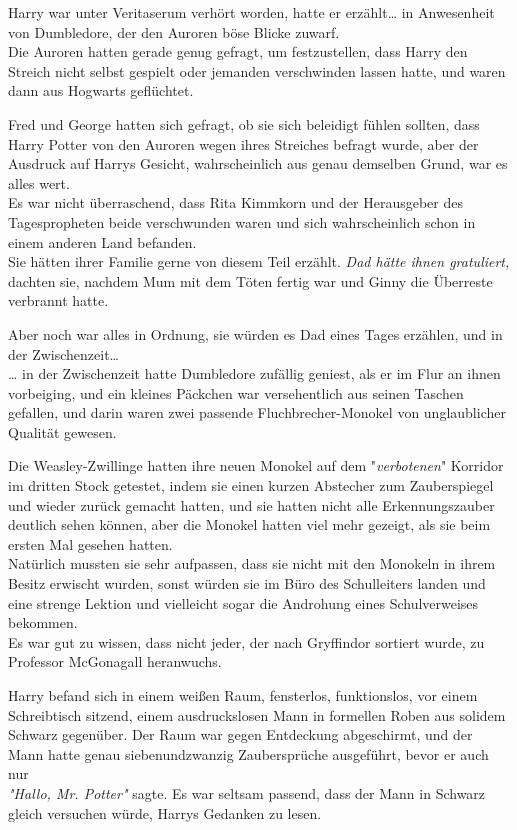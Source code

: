 {Harry war unter Veritaserum verhört worden, hatte er erzählt… in Anwesenheit von Dumbledore, der den Auroren böse Blicke zuwarf.\\ Die Auroren hatten gerade genug gefragt, um festzustellen, dass Harry den Streich nicht selbst gespielt oder jemanden verschwinden lassen hatte, und waren dann aus Hogwarts geflüchtet.

Fred und George hatten sich gefragt, ob sie sich beleidigt fühlen sollten, dass Harry Potter von den Auroren wegen ihres Streiches befragt wurde, aber der Ausdruck auf Harrys Gesicht, wahrscheinlich aus genau demselben Grund, war es alles wert.\\ Es war nicht überraschend, dass Rita Kimmkorn und der Herausgeber des Tagespropheten beide verschwunden waren und sich wahrscheinlich schon in einem anderen Land befanden.\\ Sie hätten ihrer Familie gerne von diesem Teil erzählt. \emph{Dad hätte ihnen gratuliert,} dachten sie, nachdem Mum mit dem Töten fertig war und Ginny die Überreste verbrannt hatte.

Aber noch war alles in Ordnung, sie würden es Dad eines Tages erzählen, und in der Zwischenzeit…\\ … in der Zwischenzeit hatte Dumbledore zufällig geniest, als er im Flur an ihnen vorbeiging, und ein kleines Päckchen war versehentlich aus seinen Taschen gefallen, und darin waren zwei passende Fluchbrecher-Monokel von unglaublicher Qualität gewesen.

Die Weasley-Zwillinge hatten ihre neuen Monokel auf dem "\emph{verbotenen}" Korridor im dritten Stock getestet, indem sie einen kurzen Abstecher zum Zauberspiegel und wieder zurück gemacht hatten, und sie hatten nicht alle Erkennungszauber deutlich sehen können, aber die Monokel hatten viel mehr gezeigt, als sie beim ersten Mal gesehen hatten.\\ Natürlich mussten sie sehr aufpassen, dass sie nicht mit den Monokeln in ihrem Besitz erwischt wurden, sonst würden sie im Büro des Schulleiters landen und eine strenge Lektion und vielleicht sogar die Androhung eines Schulverweises bekommen.\\ Es war gut zu wissen, dass nicht jeder, der nach Gryffindor sortiert wurde, zu Professor McGonagall heranwuchs.

Harry befand sich in einem weißen Raum, fensterlos, funktionslos, vor einem Schreibtisch sitzend, einem ausdruckslosen Mann in formellen Roben aus solidem Schwarz gegenüber. Der Raum war gegen Entdeckung abgeschirmt, und der Mann hatte genau siebenundzwanzig Zaubersprüche ausgeführt, bevor er auch nur\\ \emph{"Hallo, Mr. Potter"} sagte. Es war seltsam passend, dass der Mann in Schwarz gleich versuchen würde, Harrys Gedanken zu lesen.

}
